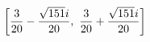 \documentclass[preview]{standalone}
\begin{document}
\begin{align*}
\special{dvisvgm:raw <g id='unique000'>}\left[ \frac{3}{20} - \frac{\sqrt{151} i}{20}, \  \frac{3}{20} + \frac{\sqrt{151} i}{20}\right]\special{dvisvgm:raw </g>}
\end{align*}
\end{document}
